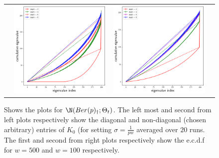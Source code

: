 \begin{figure}
{\begin{tabular}{cccc}
&
\includegraphics[scale=0.4]{figs/dgn-frg-ecdf-w100.png}
&
\includegraphics[scale=0.4]{figs/dgn-frg-ecdf-w500.png}
\end{tabular}
}
\caption{Shows the plots for $\N(Ber(p)_{\dagger};\Theta_t)$. The left most and second from left plots respectively show the diagonal and non-diagonal (chosen arbitrary) entries of $K_0$ (for setting $\sigma=\frac{1}{pw}$ averaged over $20$ runs. The first and second from right plots respectively show the e.c.d.f for $w=500$ and $w=100$ respectively. }
\label{fig:dgn-frg}
\end{figure}

